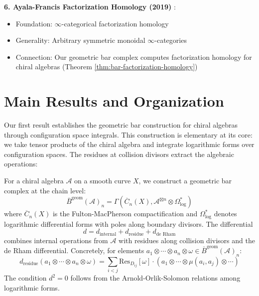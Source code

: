 \begin{remark}
\textbf{6. Ayala-Francis Factorization Homology (2019)} \cite{AF19}:
\begin{itemize}
\item Foundation: $\infty$-categorical factorization homology
\item Generality: Arbitrary symmetric monoidal $\infty$-categories
\item Connection: Our geometric bar complex computes factorization 
      homology for chiral algebras (Theorem \ref{thm:bar-factorization-homology})
\end{itemize}
\end{remark}


\section{Main Results and Organization}

Our first result establishes the geometric bar construction for chiral algebras through configuration space integrals. This construction is elementary at its core: we take tensor products of the chiral algebra and integrate logarithmic forms over configuration spaces. The residues at collision divisors extract the algebraic operations:

\begin{theorem}
For a chiral algebra $\mathcal{A}$ on a smooth curve $X$, we construct a geometric bar complex at the chain level:
$$\bar{B}^{\text{geom}}(\mathcal{A})_n = \Gamma\left(\overline{C}_n(X), \mathcal{A}^{\boxtimes n} \otimes \Omega^*_{\text{log}}\right)$$
where $\overline{C}_n(X)$ is the Fulton-MacPherson compactification and $\Omega^*_{\text{log}}$ denotes logarithmic differential forms with poles along boundary divisors. The differential 
$$d = d_{\text{internal}} + d_{\text{residue}} + d_{\text{de Rham}}$$
combines internal operations from $\mathcal{A}$ with residues along collision divisors and the de Rham differential. Concretely, for elements $a_1 \otimes \cdots \otimes a_n \otimes \omega \in \bar{B}^{\text{geom}}(\mathcal{A})_n$:
$$d_{\text{residue}}(a_1 \otimes \cdots \otimes a_n \otimes \omega) = \sum_{i<j} \text{Res}_{D_{ij}}[\omega] \cdot (a_1 \otimes \cdots \otimes \mu(a_i, a_j) \otimes \cdots)$$
The condition $d^2 = 0$ follows from the Arnold-Orlik-Solomon relations among logarithmic forms.
\end{theorem}

